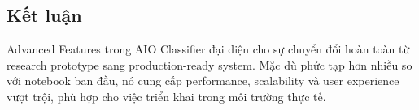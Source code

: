 \subsection{Kết luận}

Advanced Features trong AIO Classifier đại diện cho sự chuyển đổi hoàn toàn từ research prototype sang production-ready system. Mặc dù phức tạp hơn nhiều so với notebook ban đầu, nó cung cấp performance, scalability và user experience vượt trội, phù hợp cho việc triển khai trong môi trường thực tế.
